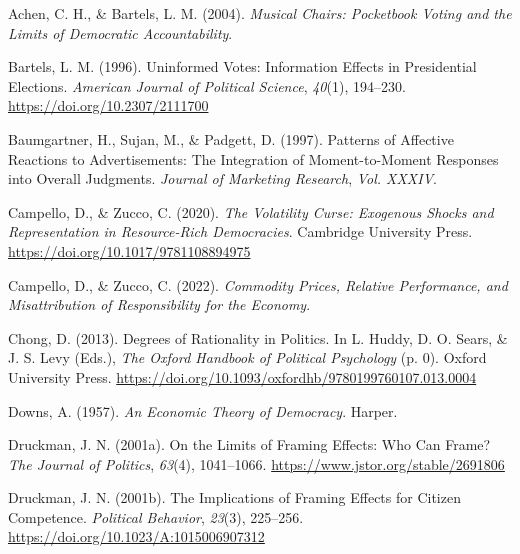 \documentclass[
]{article}
\newlength{\cslhangindent}
\newlength{\cslentryspacingunit} %
\newenvironment{CSLReferences}[2] %
 {%
  \setlength{\parindent}{0pt}
  \ifodd #1
  \let\oldpar\par
  \def\par{\hangindent=\cslhangindent\oldpar}
  \fi
  \setlength{\parskip}{#2\cslentryspacingunit}
 }%
 {}
\begin{document}
\hypertarget{refs}{}
\begin{CSLReferences}{1}{0}
\leavevmode{}%
Achen, C. H., \& Bartels, L. M. (2004). \emph{Musical {Chairs}:
{Pocketbook Voting} and the {Limits} of {Democratic Accountability}}.

\leavevmode{}%
Bartels, L. M. (1996). Uninformed {Votes}: {Information Effects} in
{Presidential Elections}. \emph{American Journal of Political Science},
\emph{40}(1), 194--230. \url{https://doi.org/10.2307/2111700}

\leavevmode{}%
Baumgartner, H., Sujan, M., \& Padgett, D. (1997). Patterns of
{Affective Reactions} to {Advertisements}: {The Integration} of
{Moment-to-Moment Responses} into {Overall Judgments}. \emph{Journal of
Marketing Research}, \emph{Vol. XXXIV}.

\leavevmode{}%
Campello, D., \& Zucco, C. (2020). \emph{The {Volatility Curse}:
{Exogenous Shocks} and {Representation} in {Resource-Rich Democracies}}.
{Cambridge University Press}.
\url{https://doi.org/10.1017/9781108894975}

\leavevmode{}%
Campello, D., \& Zucco, C. (2022). \emph{Commodity {Prices}, {Relative
Performance}, and {Misattribution} of {Responsibility} for the
{Economy}}.

\leavevmode{}%
Chong, D. (2013). Degrees of {Rationality} in {Politics}. In L. Huddy,
D. O. Sears, \& J. S. Levy (Eds.), \emph{The {Oxford Handbook} of
{Political Psychology}} (p. 0). {Oxford University Press}.
\url{https://doi.org/10.1093/oxfordhb/9780199760107.013.0004}

\leavevmode{}%
Downs, A. (1957). \emph{An {Economic Theory} of {Democracy}}. {Harper}.

\leavevmode{}%
Druckman, J. N. (2001a). On the {Limits} of {Framing Effects}: {Who Can
Frame}? \emph{The Journal of Politics}, \emph{63}(4), 1041--1066.
\url{https://www.jstor.org/stable/2691806}

\leavevmode{}%
Druckman, J. N. (2001b). The {Implications} of {Framing Effects} for
{Citizen Competence}. \emph{Political Behavior}, \emph{23}(3), 225--256.
\url{https://doi.org/10.1023/A:1015006907312}


\end{CSLReferences}
\end{document}
